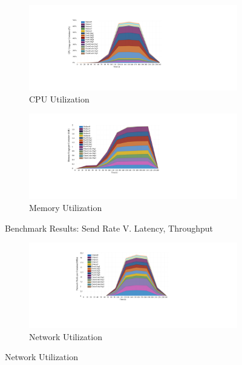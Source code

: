 \begin{figure}%
\centering
\begin{subfigure}{0.7\columnwidth}
\includegraphics[width=\columnwidth]{Figures/ICC-cpu.pdf}%
\caption{\ac{CPU} Utilization}%
\label{fig:cpu}%
\end{subfigure}\hfill%
\begin{subfigure}{0.7\columnwidth}
\includegraphics[width=\columnwidth]{Figures/ICC-mem.pdf}%
\caption{Memory Utilization}
\label{fig:mem}
\end{subfigure}\hfill%
\caption{Benchmark Results: Send Rate V. Latency, Throughput}
\label{fig_results2}%
\end{figure}
\begin{figure}[tb]\ContinuedFloat
\begin{subfigure}{0.7\columnwidth}
\includegraphics[width=\columnwidth]{Figures/ICC-net.pdf}%
\caption{Network Utilization}
\label{fig:net}
\end{subfigure}\hfill%
\end{figure}


